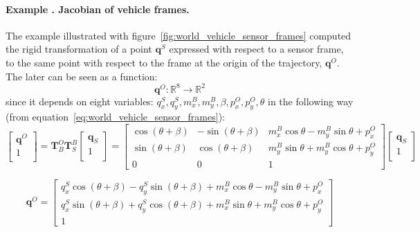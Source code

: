 \paragraph{Example \theexamplecounter. Jacobian of vehicle frames.}
The example illustrated with figure~\ref{fig:world_vehicle_sensor_frames} computed the rigid transformation of a point $\mathbf{q}^S$ expressed with respect to a sensor frame, to the same point with respect to the frame at the origin of the trajectory, $\mathbf{q}^O$. The later can be seen as a function: 
\begin{equation}
 \mathbf{q}^O : \mathbb{R}^8 \rightarrow \mathbb{R}^2
\end{equation}
since it depends on eight variables: $q^S_x,q^S_y,m^B_x,m^B_y,\beta,p^O_x,p^O_y,\theta$ in the following way (from equation~\ref{eq:world_vehicle_sensor_frames}): 
\begin{equation}
 \left[
\begin{array}{c}
    \mathbf{q}^O\\
    1 \\
 \end{array}
\right] = 
\mathbf{T}^O_B \mathbf{T}^B_S 
\left[
\begin{array}{c}
    \mathbf{q}_S\\
    1 \\
 \end{array}
\right] = 
\left[
\begin{array}{ccc}
    \cos(\theta+\beta) & -\sin(\theta+\beta) & m^B_x\cos\theta-m^B_y\sin\theta+p^O_x \\
    \sin(\theta+\beta) &  \cos(\theta+\beta) & m^B_y\sin\theta+m^B_y\cos\theta+p^O_y \\
    0 & 0 & 1
 \end{array}
\right]
\left[
\begin{array}{c}
    \mathbf{q}_S\\
    1 \\
 \end{array}
\right]
\end{equation}

\begin{equation}
\mathbf{q}^O = 
\left[
\begin{array}{c}
    q^S_x\cos(\theta+\beta) - q^S_y\sin(\theta+\beta) + m^B_x\cos\theta-m^B_y\sin\theta+p^O_x \\
    q^S_x\sin(\theta+\beta) + q^S_y\cos(\theta+\beta) + m^B_x\sin\theta+m^B_y\cos\theta+p^O_y \\
    1
 \end{array}
\right]
\end{equation}

